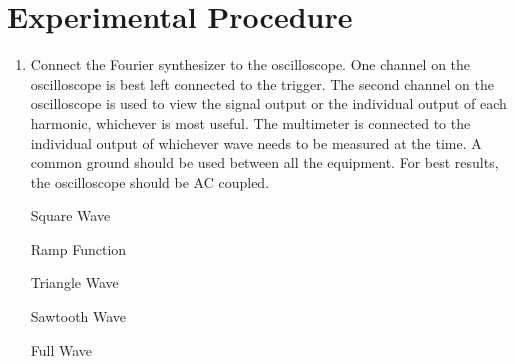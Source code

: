 \section{Experimental Procedure}
\begin{enumerate}
\item Connect the Fourier synthesizer to the oscilloscope. One channel on the oscilloscope is best left connected to the trigger. The second channel on the oscilloscope is used to view the signal output or the individual output of each harmonic, whichever is most useful. The multimeter is connected to the individual output of whichever wave needs to be measured at the time. A common ground should be used between all the equipment. For best results, the oscilloscope should be  AC coupled.


\begin{marginfigure}
\caption*{Square Wave}
\label{fig:fs5}
\end{marginfigure}

\begin{marginfigure}
\caption*{Ramp Function}
\label{fig:fs6}
\end{marginfigure}

\begin{marginfigure}
\caption*{Triangle Wave}
\label{fig:fs7}
\end{marginfigure}

\begin{marginfigure}
\caption*{Sawtooth Wave}
\label{fig:fs8}
\end{marginfigure}

\begin{marginfigure}
\caption*{Full Wave}
\label{fig:fs9}
\end{marginfigure}


\end{enumerate}
